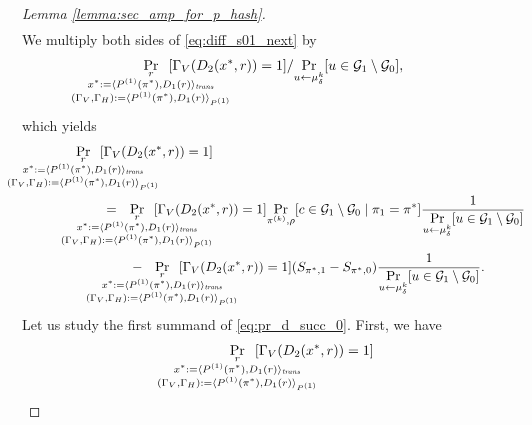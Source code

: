 \begin{proof}[Lemma \ref{lemma:sec_amp_for_p_hash}]
\begin{align}
\end{align}
We multiply both sides of \eqref{eq:diff_s01_next} by
\begin{align*}
\underset{
  \mathclap{
    \substack{r \\ x^* := \langle P^{(1)}(\pi^*), D_1(r) \rangle_{\mathit{trans}}
    \\ (\Gamma_V, \Gamma_H) := \langle P^{(1)}(\pi^*), D_1(r) \rangle_{P^{(1)}} }}}
{\Pr}\mkern13mu [\Gamma_V(D_2(x^*, r)) = 1]
/ \underset{u \leftarrow \mu_{\delta}^k}{\Pr}[ u \in \cG_1 \setminus\cG_0],
\end{align*}
%
which yields
\begin{align}
\label{eq:pr_d_succ_0}
&\IndII\underset{
  \mathclap{
    \substack{r \\ x^* := \langle P^{(1)}(\pi^*), D_1(r) \rangle_{\mathit{trans}} \\ (\Gamma_V, \Gamma_H) := \langle P^{(1)}(\pi^*), D_1(r) \rangle_{P^{(1)}} }}}
{\Pr}\mkern13mu[\Gamma_V(D_2(x^*, r)) = 1] \notag\\
%
&\IndIII = \mkern13mu
  \underset{
    \mathclap{
      \substack{r \\ x^* := \langle P^{(1)}(\pi^*), D_1 (r) \rangle_{\mathit{trans}} \\ (\Gamma_V, \Gamma_H) := \langle P^{(1)}(\pi^*), D_1 (r) \rangle_{P^{(1)}} }}}
  {\Pr}\mkern13mu[\Gamma_V(D_2(x^*, r)) = 1]
  \underset{\pi^{(k)},\rho}{\Pr}[c \in \cG_1 \setminus \cG_0 \mid \pi_1 = \pi^*]
\frac{1}{\underset{u \leftarrow \mu_{\delta}^k}{\Pr}[ u \in \cG_1 \setminus \cG_0]}\notag\\
%
&\IndIIII - \mkern13mu
\underset{
  \mathclap{
  \substack{r \\ x^* := \langle P^{(1)}(\pi^*), D_1(r) \rangle_{\mathit{trans}} \\ (\Gamma_V, \Gamma_H) := \langle P^{(1)}(\pi^*), D_1(r) \rangle_{P^{(1)}} }}}
{\Pr}\mkern13mu[\Gamma_V(D_2(x^*, r)) = 1](S_{\pi^*,1} - S_{\pi^*,0})
\frac{1}{\underset{u \leftarrow \mu_{\delta}^k}{\Pr}[ u \in \cG_1 \setminus\cG_0]}.
\end{align}
Let us study the first summand of \eqref{eq:pr_d_succ_0}. First, we have
\begin{align}
  \label{eq:pr_gamma_v_0}
  \IndII &\underset{
    \mathclap{
      \substack{r \\
        x^* := \langle P^{(1)}(\pi^*), D_1 (r) \rangle_{\mathit{trans}} \\
        (\Gamma_V, \Gamma_H) := \langle P^{(1)}(\pi^*), D_1(r) \rangle_{P^{(1)}} }}}
  {\Pr}\mkern13mu[\Gamma_V(D_2(x^*, r)) = 1] \notag\\

\end{align}
\end{proof}

